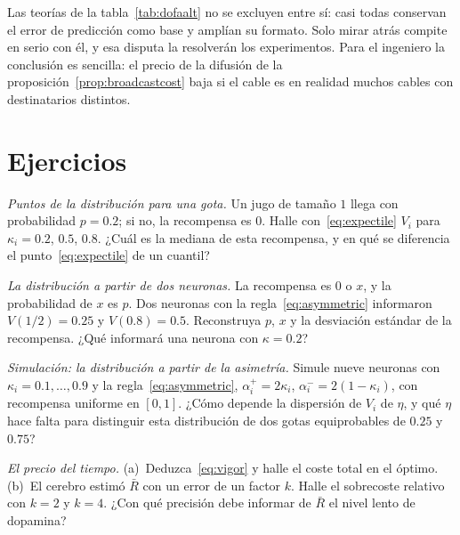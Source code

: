 Las teorías de la tabla~\ref{tab:dofaalt} no se excluyen entre sí: casi todas conservan el error de predicción como base y amplían su formato. Solo mirar atrás compite en serio con él, y esa disputa la resolverán los experimentos. Para el ingeniero la conclusión es sencilla: el precio de la difusión de la proposición~\ref{prop:broadcastcost} baja si el cable es en realidad muchos cables con destinatarios distintos.

\section{Ejercicios}

\begin{exercise}[\lvlA]
\label{ex:07:1}
\emph{Puntos de la distribución para una gota.} Un jugo de tamaño $1$ llega con probabilidad $p=0.2$; si no, la recompensa es $0$. Halle con~\eqref{eq:expectile} $V_i$ para $\kappa_i=0.2$, $0.5$, $0.8$. ¿Cuál es la mediana de esta recompensa, y en qué se diferencia el punto~\eqref{eq:expectile} de un cuantil?
\end{exercise}

\begin{exercise}[\lvlB]
\label{ex:07:2}
\emph{La distribución a partir de dos neuronas.} La recompensa es $0$ o $x$, y la probabilidad de $x$ es $p$. Dos neuronas con la regla~\eqref{eq:asymmetric} informaron $V(1/2)=0.25$ y $V(0.8)=0.5$. Reconstruya $p$, $x$ y la desviación estándar de la recompensa. ¿Qué informará una neurona con $\kappa=0.2$?
\end{exercise}

\begin{exercise}[\lvlB]
\label{ex:07:3}
\emph{Simulación: la distribución a partir de la asimetría.} Simule nueve neuronas  con $\kappa_i=0.1,\dots,0.9$ y la regla~\eqref{eq:asymmetric}, $\alpha_i^+=2\kappa_i$, $\alpha_i^-=2(1-\kappa_i)$, con recompensa uniforme en $[0,1]$. ¿Cómo depende la dispersión de $V_i$ de $\eta$, y qué $\eta$ hace falta para distinguir esta distribución de dos gotas equiprobables de $0.25$ y $0.75$?
\end{exercise}

\begin{exercise}[\lvlA]
\label{ex:07:4}
\emph{El precio del tiempo.} (a)~Deduzca~\eqref{eq:vigor} y halle el coste total en el óptimo. (b)~El cerebro estimó $\bar R$ con un error de un factor $k$. Halle el sobrecoste relativo con $k=2$ y $k=4$. ¿Con qué precisión debe informar de $\bar R$ el nivel lento de dopamina?
\end{exercise}

